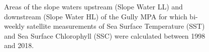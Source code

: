 \documentclass[12pt]{article}\usepackage[]{graphicx}\usepackage[]{color}
\begin{document}
\begin{figure}[htb]

{\centering {} 

}

\caption{Areas of the slope waters upstream (Slope Water LL) and downstream (Slope Water HL) of the Gully MPA for which bi-weekly satellite measurements of Sea Surface Temperature (SST) and Sea Surface Chlorophyll (SSC) were calculated between 1998 and 2018.}\label{fig:figure4}
\end{figure}
\clearpage
\end{document}
